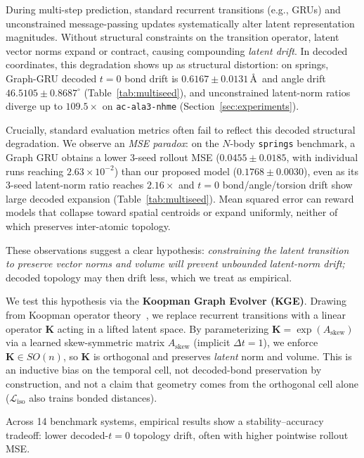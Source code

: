 \documentclass{article}
\newcommand{\K}{\mathbf{K}}
\newcommand{\Ask}{A_{\mathrm{skew}}}
\newcommand{\GKE}{\textsc{KGE}}
\begin{document}
During multi-step prediction, standard recurrent transitions (e.g., GRUs) and unconstrained message-passing updates systematically alter latent representation magnitudes. Without structural constraints on the transition operator, latent vector norms expand or contract, causing compounding \emph{latent drift}. In decoded coordinates, this degradation shows up as structural distortion: on springs, Graph-GRU decoded $t=0$ bond drift is $0.6167\pm 0.0131$\,\AA\ and angle drift $46.5105\pm 0.8687^\circ$ (Table~\ref{tab:multiseed}), and unconstrained latent-norm ratios diverge up to $109.5\times$ on \texttt{ac-ala3-nhme} (Section~\ref{sec:experiments}).

Crucially, standard evaluation metrics often fail to reflect this decoded structural degradation. We observe an \emph{MSE paradox}: on the $N$-body \texttt{springs} benchmark, a Graph GRU obtains a lower 3-seed rollout MSE ($0.0455 \pm 0.0185$, with individual runs reaching $2.63\times10^{-2}$) than our proposed model ($0.1768 \pm 0.0030$), even as its 3-seed latent-norm ratio reaches $2.16\times$ and $t=0$ bond/angle/torsion drift show large decoded expansion (Table~\ref{tab:multiseed}). Mean squared error can reward models that collapse toward spatial centroids or expand uniformly, neither of which preserves inter-atomic topology.

These observations suggest a clear hypothesis: \emph{constraining the latent transition to preserve vector norms and volume will prevent unbounded latent-norm drift;} decoded topology may then drift less, which we treat as empirical.

We test this hypothesis via the \textbf{Koopman Graph Evolver (\GKE{})}. Drawing from Koopman operator theory~\citep{koopman1931hamiltonian}, we replace recurrent transitions with a linear operator $\K$ acting in a lifted latent space. By parameterizing $\K = \exp(\Ask)$ via a learned skew-symmetric matrix $\Ask$ (implicit $\Delta t=1$), we enforce $\K \in SO(n)$, so $\K$ is orthogonal and preserves \emph{latent} norm and volume. This is an inductive bias on the temporal cell, not decoded-bond preservation by construction, and not a claim that geometry comes from the orthogonal cell alone ($\mathcal{L}_{\text{iso}}$ also trains bonded distances).

Across 14 benchmark systems, empirical results show a stability--accuracy tradeoff: lower decoded-$t=0$ topology drift, often with higher pointwise rollout MSE.
\end{document}
